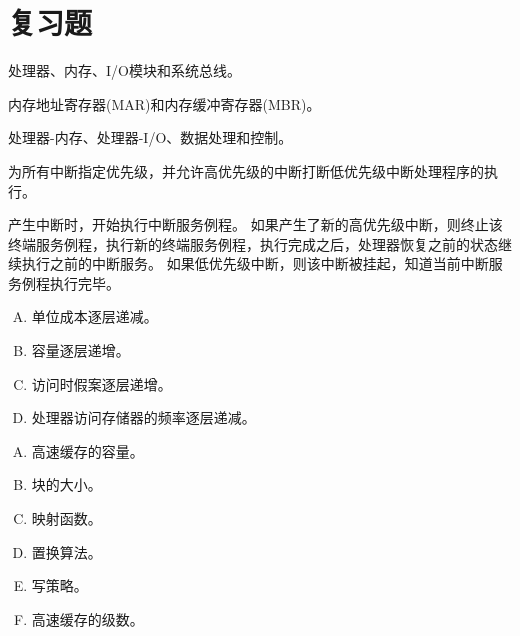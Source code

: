 
\section{复习题}
{
    \begin{reviewc}
        处理器、内存、I/O模块和系统总线。
    \end{reviewc}

    \begin{reviewc}
        内存地址寄存器(MAR)和内存缓冲寄存器(MBR)。
    \end{reviewc}

    \begin{reviewc}
        处理器-内存、处理器-I/O、数据处理和控制。
    \end{reviewc}

    \begin{reviewc}
        为所有中断指定优先级，并允许高优先级的中断打断低优先级中断处理程序的执行。
    \end{reviewc}

    \begin{reviewc}
        产生中断时，开始执行中断服务例程。
        如果产生了新的高优先级中断，则终止该终端服务例程，执行新的终端服务例程，执行完成之后，处理器恢复之前的状态继续执行之前的中断服务。
        如果低优先级中断，则该中断被挂起，知道当前中断服务例程执行完毕。
    \end{reviewc}

    \begin{reviewc}
        \begin{enumerate}[A.]
            \item 单位成本逐层递减。
            \item 容量逐层递增。
            \item 访问时假案逐层递增。
            \item 处理器访问存储器的频率逐层递减。
        \end{enumerate}
    \end{reviewc}

    \begin{reviewc}
        \begin{enumerate}[A.]
            \item 高速缓存的容量。
            \item 块的大小。
            \item 映射函数。
            \item 置换算法。
            \item 写策略。
            \item 高速缓存的级数。
        \end{enumerate}
    \end{reviewc}

}
